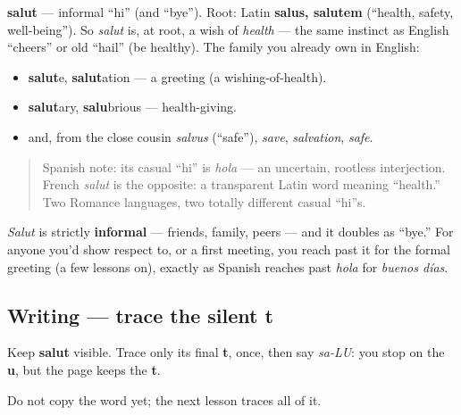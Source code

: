 \begin{cousinweb}
\textbf{salut} — informal \textquotedblleft{}hi\textquotedblright{} (and \textquotedblleft{}bye\textquotedblright{}). Root: Latin \textbf{salus, salutem} (\textquotedblleft{}health, safety, well-being\textquotedblright{}). So \emph{salut} is, at root, a wish of \emph{health} — the same instinct as English \textquotedblleft{}cheers\textquotedblright{} or old \textquotedblleft{}hail\textquotedblright{} (be healthy). The family you already own in English:

\begin{itemize}
\raggedright
  \item \textbf{salut}e, \textbf{salut}ation — a greeting (a wishing-of-health).
  \item \textbf{salut}ary, \textbf{salu}brious — health-giving.
  \item and, from the close cousin \emph{salvus} (\textquotedblleft{}safe\textquotedblright{}), \emph{save}, \emph{salvation}, \emph{safe}.
\end{itemize}

\begin{quote}
Spanish note: its casual \textquotedblleft{}hi\textquotedblright{} is \emph{hola} — an uncertain, rootless interjection. French \emph{salut} is the opposite: a transparent Latin word meaning \textquotedblleft{}health.\textquotedblright{} Two Romance languages, two totally different casual \textquotedblleft{}hi\textquotedblright{}s.
\end{quote}
\end{cousinweb}

\begin{culture}
\emph{Salut} is strictly \textbf{informal} — friends, family, peers — and it doubles as \textquotedblleft{}bye.\textquotedblright{} For anyone you'd show respect to, or a first meeting, you reach past it for the formal greeting (a few lessons on), exactly as Spanish reaches past \emph{hola} for \emph{buenos días}.
\end{culture}

\subsection*{Writing — trace the silent t}
Keep \textbf{salut} visible. Trace only its final \textbf{t}, once, then say \emph{sa-LU}: you stop on the \textbf{u}, but the page keeps the \textbf{t}.

Do not copy the word yet; the next lesson traces all of it.

